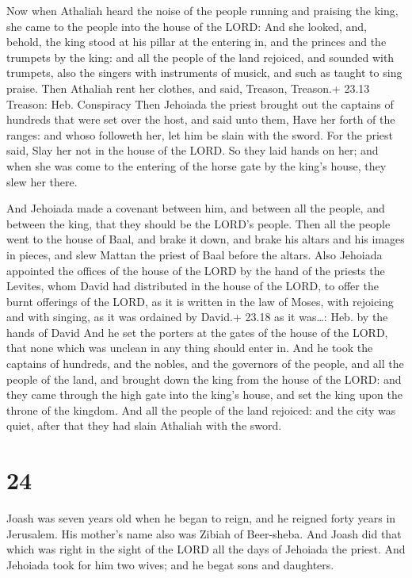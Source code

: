  Now when Athaliah heard the noise of the people running
and praising the king, she came to the people into the house of the
LORD:  And she looked, and, behold, the king stood at his
pillar at the entering in, and the princes and the trumpets by the king:
and all the people of the land rejoiced, and sounded with trumpets, also
the singers with instruments of musick, and such as taught to sing
praise. Then Athaliah rent her clothes, and said, Treason, Treason.+
23.13 Treason: Heb. Conspiracy  Then Jehoiada the priest
brought out the captains of hundreds that were set over the host, and
said unto them, Have her forth of the ranges: and whoso followeth her,
let him be slain with the sword. For the priest said, Slay her not in
the house of the LORD.  So they laid hands on her; and when
she was come to the entering of the horse gate by the king's house, they
slew her there.

 And Jehoiada made a covenant between him, and between
all the people, and between the king, that they should be the LORD's
people.  Then all the people went to the house of Baal, and
brake it down, and brake his altars and his images in pieces, and slew
Mattan the priest of Baal before the altars.  Also Jehoiada
appointed the offices of the house of the LORD by the hand of the
priests the Levites, whom David had distributed in the house of the
LORD, to offer the burnt offerings of the LORD, as it is written in the
law of Moses, with rejoicing and with singing, as it was ordained by
David.+ 23.18 as it was\ldots: Heb. by the hands of David 
And he set the porters at the gates of the house of the LORD, that none
which was unclean in any thing should enter in.  And he
took the captains of hundreds, and the nobles, and the governors of the
people, and all the people of the land, and brought down the king from
the house of the LORD: and they came through the high gate into the
king's house, and set the king upon the throne of the kingdom.
 And all the people of the land rejoiced: and the city was
quiet, after that they had slain Athaliah with the sword.

\hypertarget{section-23}{%
\section{24}\label{section-23}}

 Joash was seven years old when he began to reign, and he
reigned forty years in Jerusalem. His mother's name also was Zibiah of
Beer-sheba.  And Joash did that which was right in the sight
of the LORD all the days of Jehoiada the priest.  And
Jehoiada took for him two wives; and he begat sons and daughters.

